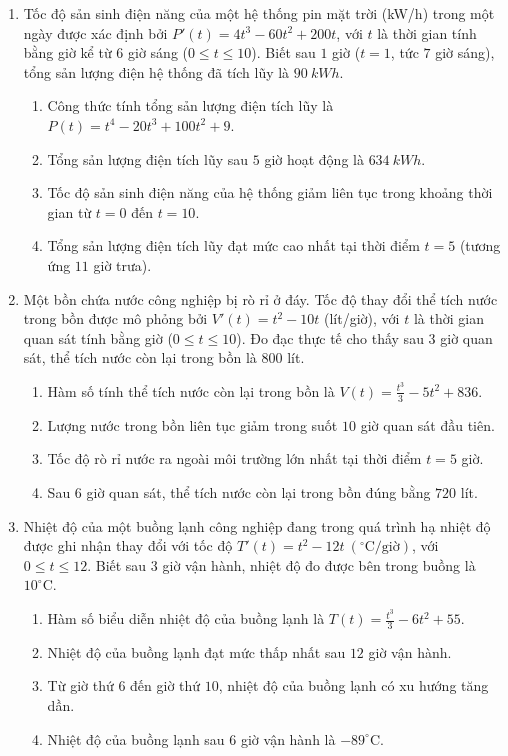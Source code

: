 \documentclass[12pt]{article}
\begin{document}
\begin{enumerate}[label=\textbf{Câu \arabic*.}, start=1]
		\item Tốc độ sản sinh điện năng của một hệ thống pin mặt trời (kW/h) trong một ngày được xác định bởi $P'(t) = 4t^3 - 60t^2 + 200t$, với $t$ là thời gian tính bằng giờ kể từ $6$ giờ sáng ($0 \le t \le 10$). Biết sau $1$ giờ ($t=1$, tức $7$ giờ sáng), tổng sản lượng điện hệ thống đã tích lũy là $90 \ kWh$.
		\begin{enumerate}[label=\alph*)]
			\item Công thức tính tổng sản lượng điện tích lũy là $P(t) = t^4 - 20t^3 + 100t^2 + 9$.
			\item Tổng sản lượng điện tích lũy sau $5$ giờ hoạt động là $634 \ kWh$.
			\item Tốc độ sản sinh điện năng của hệ thống giảm liên tục trong khoảng thời gian từ $t=0$ đến $t=10$.
			\item Tổng sản lượng điện tích lũy đạt mức cao nhất tại thời điểm $t = 5$ (tương ứng $11$ giờ trưa).
		\end{enumerate}
		
		\item Một bồn chứa nước công nghiệp bị rò rỉ ở đáy. Tốc độ thay đổi thể tích nước trong bồn được mô phỏng bởi $V'(t) = t^2 - 10t$ (lít/giờ), với $t$ là thời gian quan sát tính bằng giờ ($0 \le t \le 10$). Đo đạc thực tế cho thấy sau $3$ giờ quan sát, thể tích nước còn lại trong bồn là $800$ lít.
		\begin{enumerate}[label=\alph*)]
			\item Hàm số tính thể tích nước còn lại trong bồn là $V(t) = \frac{t^3}{3} - 5t^2 + 836$.
			\item Lượng nước trong bồn liên tục giảm trong suốt $10$ giờ quan sát đầu tiên.
			\item Tốc độ rò rỉ nước ra ngoài môi trường lớn nhất tại thời điểm $t = 5$ giờ.
			\item Sau $6$ giờ quan sát, thể tích nước còn lại trong bồn đúng bằng $720$ lít.
		\end{enumerate}
		
		\item Nhiệt độ của một buồng lạnh công nghiệp đang trong quá trình hạ nhiệt độ được ghi nhận thay đổi với tốc độ $T'(t) = t^2 - 12t \ (^\circ\text{C/giờ})$, với $0 \le t \le 12$. Biết sau $3$ giờ vận hành, nhiệt độ đo được bên trong buồng là $10^\circ\text{C}$.
		\begin{enumerate}[label=\alph*)]
			\item Hàm số biểu diễn nhiệt độ của buồng lạnh là $T(t) = \frac{t^3}{3} - 6t^2 + 55$.
			\item Nhiệt độ của buồng lạnh đạt mức thấp nhất sau $12$ giờ vận hành.
			\item Từ giờ thứ $6$ đến giờ thứ $10$, nhiệt độ của buồng lạnh có xu hướng tăng dần.
			\item Nhiệt độ của buồng lạnh sau $6$ giờ vận hành là $-89^\circ\text{C}$.
		\end{enumerate}
		

\end{enumerate}
\end{document}
